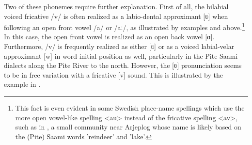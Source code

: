 Two of these phonemes require further explanation. First of all, the bilabial voiced fricative /v/ is often realized as a labio-dental approximant [ʋ] when following an open front vowel /a/ or /aː/, as illustrated by examples  and  above.\footnote{This fact is even evident in some Swedish place-name spellings which use the more open vowel-like spelling <au> instead of the fricative spelling <av>, such as in , a small community near Arjeplog whose name is likely based on the (Pite) Saami words  'reindeer' and  'lake’.} %
In this case, the open front vowel is realized as an open back vowel [ɑ]. 
Furthermore, /v/ is frequently realized as either [ʋ] or as a voiced labial-velar approximant [w] in word-initial position as well, particularly in the Pite Saami dialects along the Pite River to the north. However, the [ʋ] pronunciation seems to be in free variation with a fricative [v] sound. 
This is illustrated by the example in .%
\ea\label{cheeseNOMSG}
\Tn{\begin{tabular}{p{18mm} x{22mm} l }%
\multirow{2}{*}{/\Bf{v}u͡asːta/} &[\Bf{w}u͡asːta]\textasciitilde & \It{vuassta}		\\%
					 &[\Bf{v}u͡asːta] 			& 'cheese\BS\Sc{nom.sg}'	\\%
\end{tabular}
\hfill\pbox{\textwidth}{\hfill\hyperlink{pit110517b2}{\small[pit110517b2.038]}\\\hfill\hyperlink{pit080917c}{\small[pit080917c.9m42s]}}}
\z

